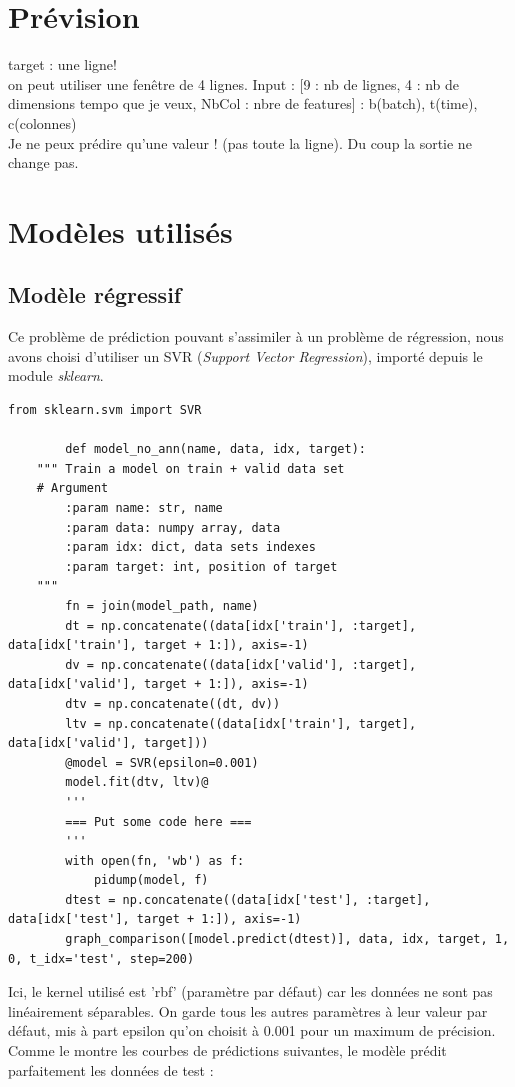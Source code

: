 \documentclass{article}
\begin{document}
    \section{Prévision}
    target : une ligne!\\ on peut utiliser une fenêtre de 4 lignes.
    Input : [9 : nb de lignes, 4 : nb de dimensions tempo que je veux, NbCol : nbre de features] : b(batch), t(time), c(colonnes)\\
    Je ne peux prédire qu'une valeur ! (pas toute la ligne). Du coup la sortie ne change pas.
    \section{Modèles utilisés}
    \subsection{Modèle régressif}
    Ce problème de prédiction pouvant s'assimiler à un problème de régression, nous avons choisi d'utiliser un SVR (\textit{Support Vector Regression}), importé depuis le module \textit{sklearn}.
    \begin{lstlisting}[frame=single]
        from sklearn.svm import SVR

        def model_no_ann(name, data, idx, target):
    """ Train a model on train + valid data set
    # Argument
        :param name: str, name
        :param data: numpy array, data
        :param idx: dict, data sets indexes
        :param target: int, position of target
    """
        fn = join(model_path, name)
        dt = np.concatenate((data[idx['train'], :target], data[idx['train'], target + 1:]), axis=-1)
        dv = np.concatenate((data[idx['valid'], :target], data[idx['valid'], target + 1:]), axis=-1)
        dtv = np.concatenate((dt, dv))
        ltv = np.concatenate((data[idx['train'], target], data[idx['valid'], target]))
        @model = SVR(epsilon=0.001)
        model.fit(dtv, ltv)@
        '''
        === Put some code here ===
        '''
        with open(fn, 'wb') as f:
            pidump(model, f)
        dtest = np.concatenate((data[idx['test'], :target], data[idx['test'], target + 1:]), axis=-1)
        graph_comparison([model.predict(dtest)], data, idx, target, 1, 0, t_idx='test', step=200)
    \end{lstlisting}
    Ici, le kernel utilisé est 'rbf' (paramètre par défaut) car les données ne sont pas linéairement séparables. On garde tous les autres paramètres à leur valeur par défaut, mis à part epsilon qu'on choisit à 0.001 pour un maximum de précision. Comme le montre les courbes de prédictions suivantes, le modèle prédit parfaitement les données de test :
\end{document}
